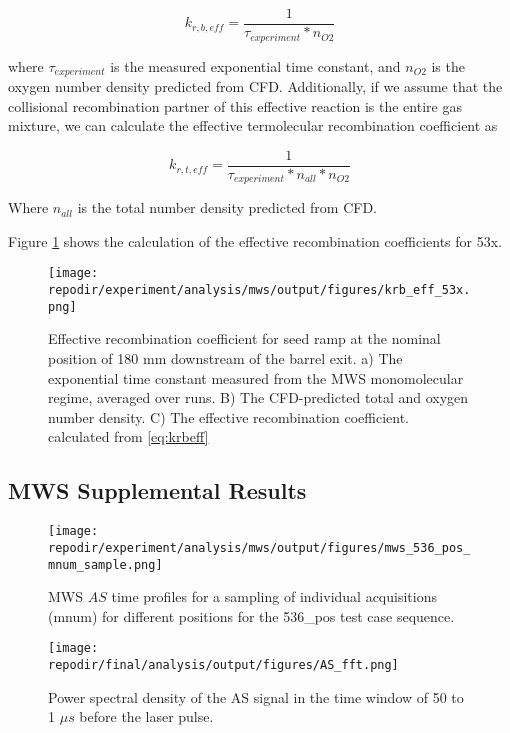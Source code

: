 \begin{equation}
    \label{eq:krbeff}
    k_{r,b,eff} = \frac{1}{\tau_{experiment} *  n_{O2}}
\end{equation}

where $\tau_{experiment}$ is the measured exponential time constant,  and $n_{O2}$ is the oxygen number density predicted from CFD. Additionally, if we assume that the collisional recombination partner of this effective reaction is the entire gas mixture, we can calculate the effective termolecular recombination coefficient as


\begin{equation}
    \label{eq:krteff}
    k_{r,t,eff} = \frac{1}{\tau_{experiment} * n_{all} *  n_{O2}}
\end{equation}

Where $n_{all}$ is the total number density predicted from CFD.

Figure \ref{fig:SI_krb_eff_53x} shows the calculation of the effective recombination coefficients for 53x.

\begin{figure}[]
\centering
\texttt{[image: \\repodir/experiment/analysis/mws/output/figures/krb\_eff\_53x.png]}
\caption{Effective recombination coefficient for seed ramp at the nominal position of 180 mm downstream of the barrel exit. a) The exponential time constant measured from the MWS monomolecular regime, averaged over runs. B) The CFD-predicted total and oxygen number density. C) The effective recombination coefficient. calculated from \ref{eq:krbeff}}
\label{fig:SI_krb_eff_53x}
\end{figure}

\subsection{MWS Supplemental Results}



\begin{figure}[]
\centering
\texttt{[image: \\repodir/experiment/analysis/mws/output/figures/mws\_536\_pos\_mnum\_sample.png]}
\caption{MWS $AS$ time profiles for a sampling of individual acquisitions (mnum) for different positions for the 536\_pos test case sequence.}
\label{fig:SI_mws_536_pos_mnum_sample}
\end{figure}

\begin{figure}
    \centering
    \texttt{[image: \\repodir/final/analysis/output/figures/AS\_fft.png]} 
    \caption{Power spectral density of the AS signal in the time window of 50 to 1 $\mu s$ before the laser pulse.}
    \label{fig:SI_AS_fft}
\end{figure}

